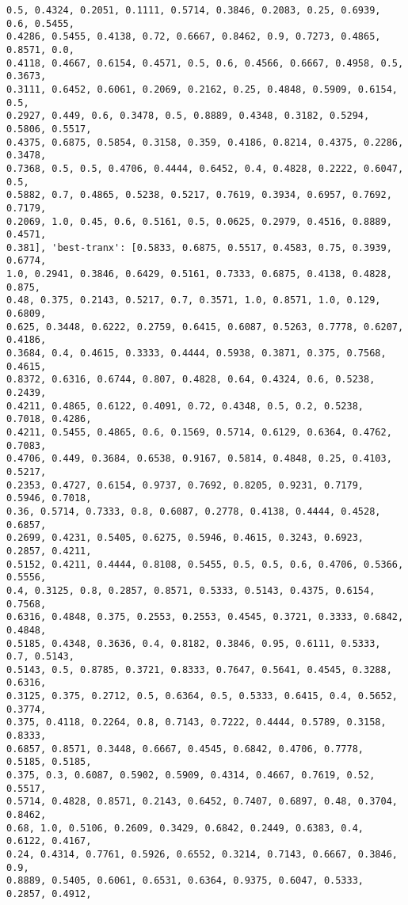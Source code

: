 \documentclass[11pt]{article}
\begin{document}
\begin{Verbatim}[commandchars=\\\{\}]
0.5, 0.4324, 0.2051, 0.1111, 0.5714, 0.3846, 0.2083, 0.25, 0.6939, 0.6, 0.5455,
0.4286, 0.5455, 0.4138, 0.72, 0.6667, 0.8462, 0.9, 0.7273, 0.4865, 0.8571, 0.0,
0.4118, 0.4667, 0.6154, 0.4571, 0.5, 0.6, 0.4566, 0.6667, 0.4958, 0.5, 0.3673,
0.3111, 0.6452, 0.6061, 0.2069, 0.2162, 0.25, 0.4848, 0.5909, 0.6154, 0.5,
0.2927, 0.449, 0.6, 0.3478, 0.5, 0.8889, 0.4348, 0.3182, 0.5294, 0.5806, 0.5517,
0.4375, 0.6875, 0.5854, 0.3158, 0.359, 0.4186, 0.8214, 0.4375, 0.2286, 0.3478,
0.7368, 0.5, 0.5, 0.4706, 0.4444, 0.6452, 0.4, 0.4828, 0.2222, 0.6047, 0.5,
0.5882, 0.7, 0.4865, 0.5238, 0.5217, 0.7619, 0.3934, 0.6957, 0.7692, 0.7179,
0.2069, 1.0, 0.45, 0.6, 0.5161, 0.5, 0.0625, 0.2979, 0.4516, 0.8889, 0.4571,
0.381], 'best-tranx': [0.5833, 0.6875, 0.5517, 0.4583, 0.75, 0.3939, 0.6774,
1.0, 0.2941, 0.3846, 0.6429, 0.5161, 0.7333, 0.6875, 0.4138, 0.4828, 0.875,
0.48, 0.375, 0.2143, 0.5217, 0.7, 0.3571, 1.0, 0.8571, 1.0, 0.129, 0.6809,
0.625, 0.3448, 0.6222, 0.2759, 0.6415, 0.6087, 0.5263, 0.7778, 0.6207, 0.4186,
0.3684, 0.4, 0.4615, 0.3333, 0.4444, 0.5938, 0.3871, 0.375, 0.7568, 0.4615,
0.8372, 0.6316, 0.6744, 0.807, 0.4828, 0.64, 0.4324, 0.6, 0.5238, 0.2439,
0.4211, 0.4865, 0.6122, 0.4091, 0.72, 0.4348, 0.5, 0.2, 0.5238, 0.7018, 0.4286,
0.4211, 0.5455, 0.4865, 0.6, 0.1569, 0.5714, 0.6129, 0.6364, 0.4762, 0.7083,
0.4706, 0.449, 0.3684, 0.6538, 0.9167, 0.5814, 0.4848, 0.25, 0.4103, 0.5217,
0.2353, 0.4727, 0.6154, 0.9737, 0.7692, 0.8205, 0.9231, 0.7179, 0.5946, 0.7018,
0.36, 0.5714, 0.7333, 0.8, 0.6087, 0.2778, 0.4138, 0.4444, 0.4528, 0.6857,
0.2699, 0.4231, 0.5405, 0.6275, 0.5946, 0.4615, 0.3243, 0.6923, 0.2857, 0.4211,
0.5152, 0.4211, 0.4444, 0.8108, 0.5455, 0.5, 0.5, 0.6, 0.4706, 0.5366, 0.5556,
0.4, 0.3125, 0.8, 0.2857, 0.8571, 0.5333, 0.5143, 0.4375, 0.6154, 0.7568,
0.6316, 0.4848, 0.375, 0.2553, 0.2553, 0.4545, 0.3721, 0.3333, 0.6842, 0.4848,
0.5185, 0.4348, 0.3636, 0.4, 0.8182, 0.3846, 0.95, 0.6111, 0.5333, 0.7, 0.5143,
0.5143, 0.5, 0.8785, 0.3721, 0.8333, 0.7647, 0.5641, 0.4545, 0.3288, 0.6316,
0.3125, 0.375, 0.2712, 0.5, 0.6364, 0.5, 0.5333, 0.6415, 0.4, 0.5652, 0.3774,
0.375, 0.4118, 0.2264, 0.8, 0.7143, 0.7222, 0.4444, 0.5789, 0.3158, 0.8333,
0.6857, 0.8571, 0.3448, 0.6667, 0.4545, 0.6842, 0.4706, 0.7778, 0.5185, 0.5185,
0.375, 0.3, 0.6087, 0.5902, 0.5909, 0.4314, 0.4667, 0.7619, 0.52, 0.5517,
0.5714, 0.4828, 0.8571, 0.2143, 0.6452, 0.7407, 0.6897, 0.48, 0.3704, 0.8462,
0.68, 1.0, 0.5106, 0.2609, 0.3429, 0.6842, 0.2449, 0.6383, 0.4, 0.6122, 0.4167,
0.24, 0.4314, 0.7761, 0.5926, 0.6552, 0.3214, 0.7143, 0.6667, 0.3846, 0.9,
0.8889, 0.5405, 0.6061, 0.6531, 0.6364, 0.9375, 0.6047, 0.5333, 0.2857, 0.4912,

\end{Verbatim}
\end{document}
